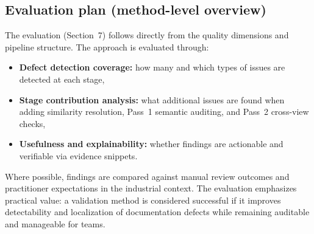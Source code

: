 \subsection{Evaluation plan (method-level overview)}
The evaluation (Section~7) follows directly from the quality dimensions and pipeline structure. The approach is evaluated through:
\begin{itemize}
    \item \textbf{Defect detection coverage:} how many and which types of issues are detected at each stage,
    \item \textbf{Stage contribution analysis:} what additional issues are found when adding similarity resolution, Pass~1 semantic auditing, and Pass~2 cross-view checks,
    \item \textbf{Usefulness and explainability:} whether findings are actionable and verifiable via evidence snippets.
\end{itemize}

Where possible, findings are compared against manual review outcomes and practitioner expectations in the industrial context. The evaluation emphasizes practical value: a validation method is considered successful if it improves detectability and localization of documentation defects while remaining auditable and manageable for teams.
